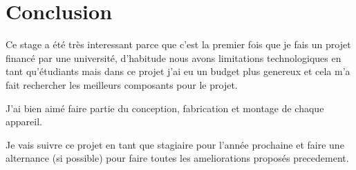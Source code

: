 \documentclass[12pt]{article}
\begin{document}


\section{Conclusion}
\begin{par}
	Ce stage a \'et\'e tr\`es interessant parce que
	c'est la premier fois que je fais un projet 
	financ\'e par une universit\'e, d'habitude nous
	avons limitations technologiques en tant qu'\'etudiants
	mais dans ce projet j'ai eu un budget plus genereux
	et cela m'a fait rechercher les meilleurs composants
	pour le projet.
\end{par}
\begin{par}
	J'ai bien aimé faire partie du conception, fabrication et
	montage de chaque appareil.
\end{par}
\begin{par}
	Je vais suivre ce projet en tant que stagiaire pour
	l'ann\'ee prochaine et faire une alternance (si possible)
	pour faire toutes les ameliorations propos\'es precedement.
\end{par}

%

%




%

%
\end{document}
